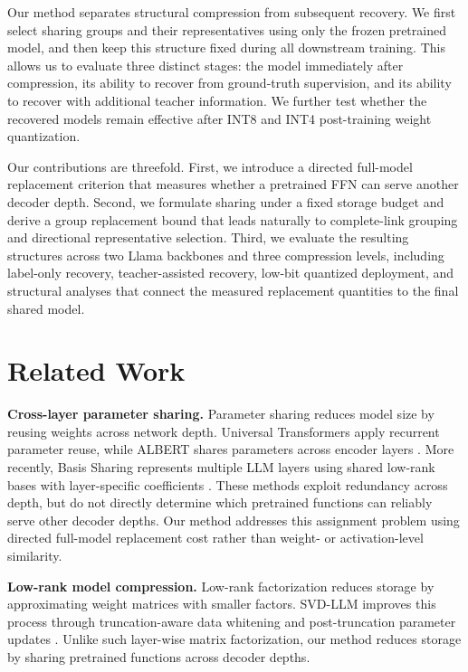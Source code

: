 \documentclass{article}
\begin{document}
Our method separates structural compression from subsequent recovery.
We first select sharing groups and their representatives using only the frozen
pretrained model, and then keep this structure fixed during all downstream
training. This allows us to evaluate three distinct stages: the model
immediately after compression, its ability to recover from ground-truth
supervision, and its ability to recover with additional teacher information.
We further test whether the recovered models remain effective after INT8 and
INT4 post-training weight quantization.

Our contributions are threefold. First, we introduce a directed full-model
replacement criterion that measures whether a pretrained FFN can serve another
decoder depth. Second, we formulate sharing under a fixed storage budget and
derive a group replacement bound that leads naturally to complete-link grouping
and directional representative selection. Third, we evaluate the resulting
structures across two Llama backbones and three compression levels, including
label-only recovery, teacher-assisted recovery, low-bit quantized deployment,
and structural analyses that connect the measured replacement quantities to
the final shared model.

\section{Related Work}

\textbf{Cross-layer parameter sharing.}
Parameter sharing reduces model size by reusing weights across network depth.
Universal Transformers apply recurrent parameter reuse, while ALBERT shares
parameters across encoder layers \cite{dehghani2019universal,lan2020albert}.
More recently, Basis Sharing represents multiple LLM layers using shared
low-rank bases with layer-specific coefficients \cite{wang2025basis}.
These methods exploit redundancy across depth, but do not directly determine
which pretrained functions can reliably serve other decoder depths. Our method
addresses this assignment problem using directed full-model replacement cost
rather than weight- or activation-level similarity.

\textbf{Low-rank model compression.}
Low-rank factorization reduces storage by approximating weight matrices with
smaller factors. SVD-LLM improves this process through truncation-aware data
whitening and post-truncation parameter updates \cite{wang2025svdllm}.
Unlike such layer-wise matrix factorization, our method reduces storage by
sharing pretrained functions across decoder depths.
\end{document}
